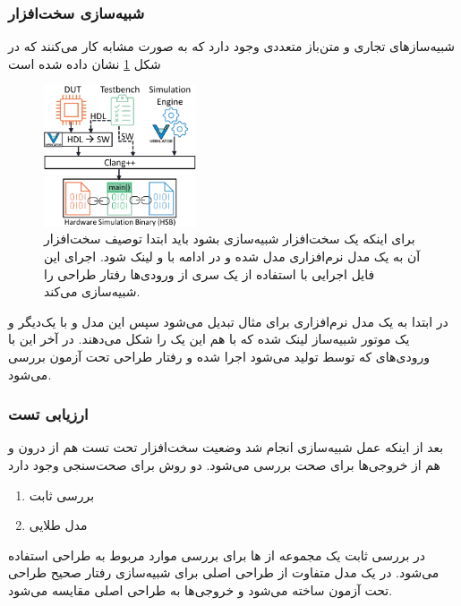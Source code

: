 \documentclass[conference]{IEEEtran}
\begin{document}
\subsubsection{شبیه‌سازی سخت‌افزار}
شبیه‌ساز‌های تجاری و متن‌باز متعددی وجود دارد که به صورت مشابه کار می‌کنند
که در شکل 
\ref{fig1}
نشان داده شده است
\begin{figure}[!t]
    \centering
    \includegraphics[width=0.4\textwidth]{hsb.png}
    \caption{
        برای اینکه یک سخت‌افزار شبیه‌سازی بشود باید ابتدا توصیف سخت‌افزار
        آن به یک مدل نرم‌افزاری مدل شده و در ادامه با
        و
        لینک شود.
        اجرای این فایل اجرایی با استفاده از یک سری از ورودی‌ها رفتار طراحی را شبیه‌سازی می‌کند.
    }
    \label{fig1}
\end{figure}
در ابتدا
به یک مدل نرم‌افزاری برای مثال
تبدیل می‌شود سپس این مدل و
با یک‌دیگر و یک موتور شبیه‌ساز لینک شده که با هم این یک
را شکل می‌دهند.
در آخر این
با ورودی‌های که توسط
تولید می‌شود اجرا شده و رفتار طراحی تحت آزمون بررسی می‌شود.
\subsubsection{ارزیابی تست}
بعد از اینکه عمل شبیه‌سازی انجام شد وضعیت سخت‌افزار تحت تست هم از درون و هم از خروجی‌ها
برای صحت بررسی می‌شود.
دو روش برای صحت‌سنجی وجود دارد
\begin{enumerate}
    \item بررسی ثابت
    \item مدل طلایی
\end{enumerate}
در بررسی ثابت یک مجموعه از
ها برای بررسی موارد مربوط به طراحی استفاده می‌شود.
در
یک مدل متفاوت از طراحی اصلی برای شبیه‌سازی رفتار صحیح طراحی تحت آزمون ساخته می‌شود
و خروجی‌ها به طراحی اصلی مقایسه می‌شود.
\end{document}
